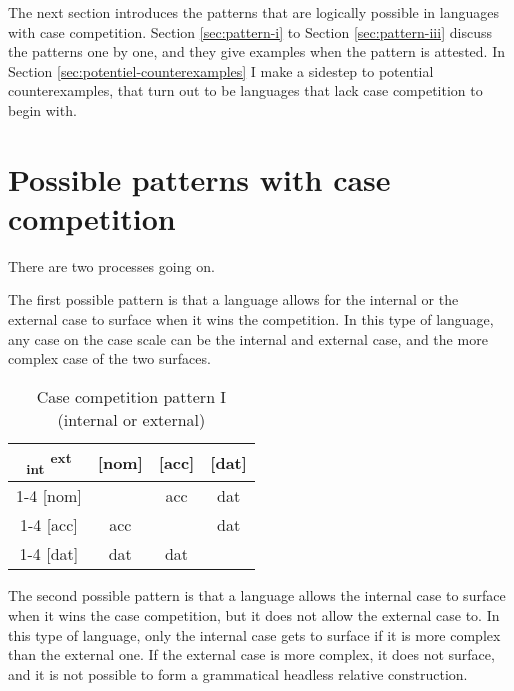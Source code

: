 The next section introduces the patterns that are logically possible in languages with case competition. Section \ref{sec:pattern-i} to Section \ref{sec:pattern-iii} discuss the patterns one by one, and they give examples when the pattern is attested. In Section \ref{sec:potentiel-counterexamples} I make a sidestep to potential counterexamples, that turn out to be languages that lack case competition to begin with.


\section{Possible patterns with case competition}

There are two processes going on.

The first possible pattern is that a language allows for the internal or the external case to surface when it wins the competition. In this type of language, any case on the case scale can be the internal and external case, and the more complex case of the two surfaces.

\begin{table}[H]
  \center
  \caption{Case competition pattern I (internal or external)}
  \begin{tabular}{c|c|c|c}
    \toprule
        \textsubscript{\ac{int}} \textsuperscript{\ac{ext}}
          & [\ac{nom}]
          & [\ac{acc}]
          & [\ac{dat}]
          \\ \cmidrule{1-4}
      [\ac{nom}]
          &
          & \ac{acc}
          & \ac{dat}
          \\ \cmidrule{1-4}
      [\ac{acc}]
          & \ac{acc}
          &
          & \ac{dat}
          \\ \cmidrule{1-4}
      [\ac{dat}]
          & \ac{dat}
          & \ac{dat}
          &
          \\
    \bottomrule
  \end{tabular}
    \label{tbl:case-competition-pattern-i}
\end{table}

The second possible pattern is that a language allows the internal case to surface when it wins the case competition, but it does not allow the external case to. In this type of language, only the internal case gets to surface if it is more complex than the external one. If the external case is more complex, it does not surface, and it is not possible to form a grammatical headless relative construction.

